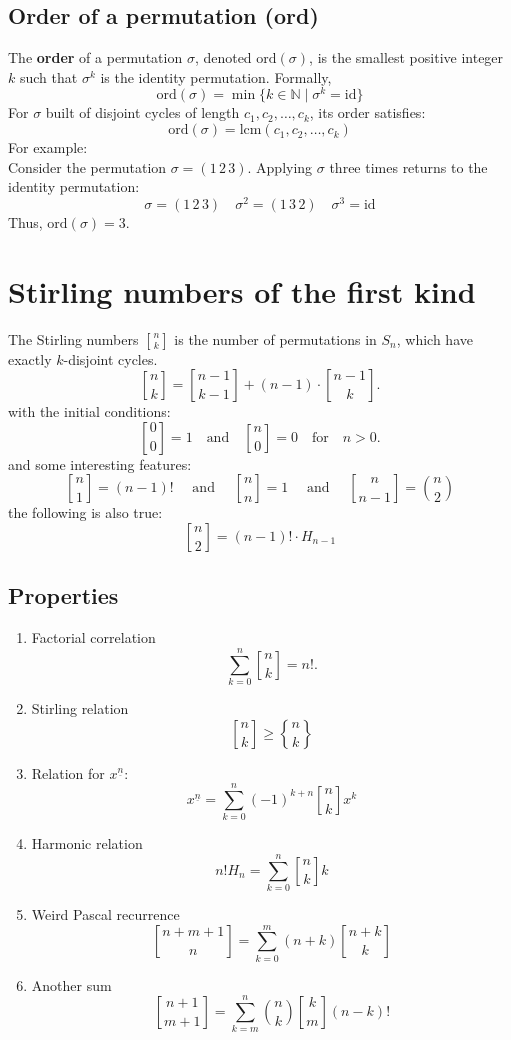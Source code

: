 \documentclass{article}
\begin{document}
\subsection{Order of a permutation (ord)}
The \textbf{order} of a permutation \(\sigma\), denoted \(\text{ord}(\sigma)\), is the smallest positive integer \(k\) such that \(\sigma^k\) is the identity permutation. Formally,
\[
\text{ord}(\sigma) = \min \{ k \in \mathbb{N} \mid \sigma^k = \text{id} \}
\]
For \(\sigma\) built of disjoint cycles of length \(c_1,c_2,\dots,c_k\), its order satisfies:
\[\text{ord}(\sigma)=\text{lcm}(c_1,c_2,\dots,c_k)\]
For example:\\
Consider the permutation \(\sigma = (1\, 2\, 3)\). Applying \(\sigma\) three times returns to the identity permutation:
\[
\sigma = (1\, 2\, 3) \quad \sigma^2 = (1\, 3\, 2) \quad \sigma^3 = \text{id}
\]
Thus, \(\text{ord}(\sigma) = 3\).

\section{Stirling numbers of the first kind}

The Stirling numbers \(\genfrac[]{0pt}{1}{n}{k}\) is the number of permutations in \(S_n\), which have exactly $k$-disjoint cycles.
\[
\genfrac[]{0pt}{0}{n}{k}= \genfrac[]{0pt}{0}{n-1}{k-1} + (n-1)\cdot \genfrac[]{0pt}{0}{n-1}{k}.
\]
with the initial conditions:
\[
\genfrac[]{0pt}{0}{0}{0} = 1 \quad \text{and} \quad \genfrac[]{0pt}{0}{n}{0} = 0 \quad \text{for} \quad n > 0.
\]
and some interesting features:
\[
\genfrac[]{0pt}{0}{n}{1} = (n-1)! \quad \text{ and } \quad \genfrac[]{0pt}{0}{n}{n} = 1 \quad \text{ and } \quad \genfrac[]{0pt}{0}{n}{n-1} = \binom{n}{2}
\]
the following is also true:
\[
\genfrac[]{0pt}{0}{n}{2} = (n-1)!\cdot H_{n-1}
\]

\subsection{Properties}

\begin{enumerate}
    \item Factorial correlation
    \[
    \sum_{k=0}^n \genfrac[]{0pt}{0}{n}{k} = n!.
    \]
    \item Stirling relation
    \[
    \genfrac[]{0pt}{0}{n}{k} \geq \genfrac\{\}{0pt}{0}{n}{k}
    \]
    \item Relation for $x^{\underline{n}}$:
    \[
    x^{\underline{n}} = \sum_{k=0}^{n} (-1)^{k+n} \genfrac[]{0pt}{0}{n}{k} x^k
    \]
    \item Harmonic relation
    \[
    n! H_{n} = \sum_{k=0}^{n} \genfrac[]{0pt}{0}{n}{k} k
    \]
    \item Weird Pascal recurrence
    \[
    \genfrac[]{0pt}{0}{n+m+1}{n} = \sum_{k=0}^{m} (n+k) \genfrac[]{0pt}{0}{n+k}{k}
    \]
    \item Another sum
    \[
    \genfrac[]{0pt}{0}{n+1}{m+1} = \sum_{k=m}^{n} \binom{n}{k}\genfrac[]{0pt}{0}{k}{m} (n-k)!
    \]
\end{enumerate}
\end{document}
